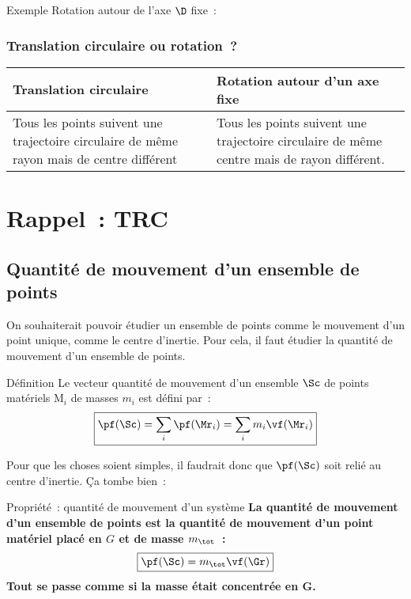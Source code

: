 \documentclass[../main/main.tex]{subfiles}
\begin{document}
\begin{rexem}{Exemple}
    Rotation autour de l'axe $\D$ fixe~:
\end{rexem}

\subsubsection{Translation circulaire ou rotation~?}
\begin{table}[!h]
    \centering
    \begin{tabularx}{.8\linewidth}{YY}
        \toprule
        Translation circulaire & Rotation autour d'un axe fixe
        \\\midrule
        Tous les points suivent une trajectoire circulaire de même rayon mais de
        centre différent & Tous les points suivent une trajectoire circulaire de
        même centre mais de rayon différent.
        \\\bottomrule
    \end{tabularx}
\end{table}

\section{Rappel~: TRC}
\subsection{Quantité de mouvement d'un ensemble de points}

On souhaiterait pouvoir étudier un ensemble de points comme le mouvement d'un
point unique, comme le centre d'inertie. Pour cela, il faut étudier la quantité
de mouvement d'un ensemble de points.

\begin{tdefi}{Définition}
    Le vecteur quantité de mouvement d'un ensemble $\Sc$ de points matériels
    M$_i$ de masses $m_i$ est défini par~:
    \[\boxed{\pf(\Sc) = \sum_i\pf(\Mr_i) = \sum_i m_i \vf(\Mr_i)}\]
\end{tdefi}

Pour que les choses soient simples, il faudrait donc que $\pf(\Sc)$ soit relié
au centre d'inertie. Ça tombe bien~:

\begin{tprop}{Propriété~: quantité de mouvement d'un système}
    \centering\bfseries
    La quantité de mouvement d'un ensemble de points est la quantité de
    mouvement d'un point matériel placé en $G$ et de masse $m_{\tot}$~:
    \[\boxed{\pf(\Sc) = m_{\tot}\vf(\Gr)}\]
    Tout se passe comme si la masse était concentrée en G.
\end{tprop}
\end{document}
